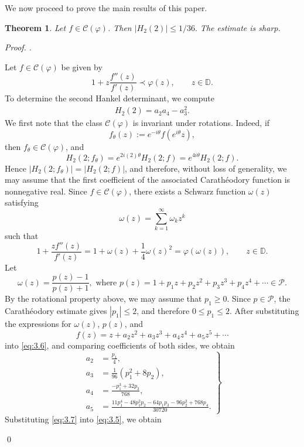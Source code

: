 \documentclass[a4paper,12pt,reqno]{amsart} %
\numberwithin{equation}{section}
\newtheorem{thm}{Theorem}[section]
\theoremstyle{definition}
\newenvironment{pf}[1][]{%
	\vskip 3mm
	\noindent
	\ifthenelse{\equal{#1}{}}%
	{{\slshape Proof. }}%
	{{\slshape #1.} }%
}%
{\qed\bigskip}
\begin{document}
We now proceed to prove the main results of this paper.
\begin{thm}\label{thm4.2}
Let $f\in \mathcal{C}(\varphi)$. Then
$
|H_2(2)|\le {1}/{36}.
$
The estimate is sharp.
\end{thm}

\begin{pf}
Let $f\in \mathcal{C}(\varphi)$ be given by 
\[
1+z\frac{f''(z)}{f'(z)}\prec \varphi(z), \qquad z\in \mathbb{D}.
\]
To determine the second Hankel determinant, we compute
\begin{align}\label{eq:3.5}
H_2(2)=a_2 a_4-a_3^2.
\end{align}
We first note that the class $\mathcal{C}(\varphi)$ is invariant under rotations. Indeed, if
\[
f_\theta(z):=e^{-i\theta}f(e^{i\theta}z),
\]
then \(f_\theta\in \mathcal{C}(\varphi)\), and
\[
H_2(2;f_\theta)=e^{2i(2)\theta}H_2(2;f)=e^{4i\theta}H_2(2;f).
\]
Hence \(|H_2(2;f_\theta)|=|H_2(2;f)|\), and therefore, without loss of generality, we may assume that the first coefficient of the associated Carath\'eodory function is nonnegative real.
Since $f\in \mathcal{C}(\varphi)$, there exists a Schwarz function $\omega(z)$ satisfying
\[
\omega(z)=\sum_{k=1}^{\infty} \omega_k z^k
\]
such that
\begin{equation}\label{eq:3.6}
1+\frac{z f''(z)}{f'(z)}
=
1+\omega(z)+\frac{1}{4}\omega(z)^2
=
\varphi(\omega(z)),
\qquad z\in \mathbb{D}.
\end{equation}
Let
\[
\omega(z)=\frac{p(z)-1}{p(z)+1},
\text{ where }
p(z)=1+p_1 z+p_2 z^2+p_3 z^3+p_4 z^4+\cdots \in \mathcal{P}.
\]
By the rotational property above, we may assume that $p_1\ge 0$. Since $p\in\mathcal{P}$, the Carath\'eodory estimate gives $|p_1|\le 2$, and therefore
$
0\le p_1\le 2.
$
After substituting the expressions for $\omega(z)$, $p(z)$, and
\[
f(z)=z+a_2 z^2+a_3 z^3+a_4 z^4+a_5 z^5+\cdots
\]
into \eqref{eq:3.6}, and comparing  coefficients of both sides, we obtain
\begin{equation}\label{eq:3.7}
\left.
\begin{aligned}
	a_2 &= \frac{p_1}{4}, \\[6pt]
	a_3 &= \frac{1}{96}\left(p_1^2+8p_2\right), \\[6pt]
	a_4 &= \frac{-p_1^3+32p_3}{768}, \\[6pt]
	a_5 &= \frac{
		11p_1^4
		-48p_1^2p_2
		-64p_1p_3
		-96p_2^2
		+768p_4
	}{30720}.
\end{aligned}
\right\}
\end{equation}
Substituting \eqref{eq:3.7} into \eqref{eq:3.5}, we obtain

\end{pf}
\end{document}
